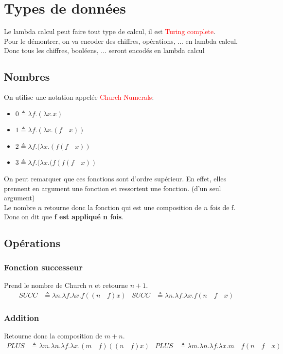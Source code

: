 \documentclass{report}
\begin{document}
\section{Types de données}
Le lambda calcul peut faire tout type de calcul, il est \textcolor{red}{Turing complete}.\\
Pour le démontrer, on va encoder des chiffres, opérations, ... en lambda calcul. Donc tous les chiffres, booléens, ... seront encodés en lambda calcul

\subsection{Nombres}
On utilise une notation appelée \textcolor{red}{Church Numerals}:
\begin{itemize}
\item $0 \triangleq \lambda f.(\lambda x.x)$
\item $1 \triangleq \lambda f.(\lambda x.(f \quad x))$
\item $2 \triangleq \lambda f.(\lambda x.(f (f \quad x))$
\item $3 \triangleq \lambda f.(\lambda x.(f (f (f \quad x))$
\end{itemize}
On peut remarquer que ces fonctions sont d'ordre supérieur. En effet, elles prennent en argument une fonction et ressortent une fonction. (d'un seul argument)\\
Le nombre $n$ retourne donc la fonction qui est une composition de $n$ fois de f. Donc on dit que \textbf{f est appliqué n fois}.

\subsection{Opérations}
\subsubsection{Fonction successeur}
Prend le nombre de Church $n$ et retourne $n+1$.
\begin{align*}
SUCC &\triangleq \lambda n.\lambda f.\lambda x.f((n \quad f)x) & SUCC &\triangleq \lambda n.\lambda f.\lambda x.f(n \quad f \quad x)
\end{align*}

\subsubsection{Addition}
Retourne donc la composition de $m+n$.
\begin{align*}
PLUS &\triangleq \lambda m.\lambda n.\lambda f	. \lambda x.(m \quad f)((n \quad f)x) & PLUS &\triangleq \lambda m.\lambda n.\lambda f	. \lambda x.m \quad f(n \quad f \quad x)
\end{align*}
\end{document}
